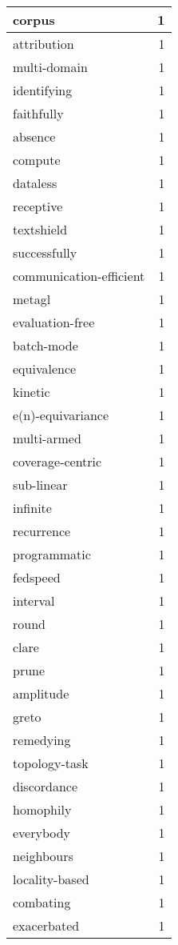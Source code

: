 \begin{table}[h]
\begin{tabular}{|l|r|}
\hline
corpus & 1 \\
\hline
attribution & 1 \\
\hline
multi-domain & 1 \\
\hline
identifying & 1 \\
\hline
faithfully & 1 \\
\hline
absence & 1 \\
\hline
compute & 1 \\
\hline
dataless & 1 \\
\hline
receptive & 1 \\
\hline
textshield & 1 \\
\hline
successfully & 1 \\
\hline
communication-efficient & 1 \\
\hline
metagl & 1 \\
\hline
evaluation-free & 1 \\
\hline
batch-mode & 1 \\
\hline
equivalence & 1 \\
\hline
kinetic & 1 \\
\hline
e(n)-equivariance & 1 \\
\hline
multi-armed & 1 \\
\hline
coverage-centric & 1 \\
\hline
sub-linear & 1 \\
\hline
infinite & 1 \\
\hline
recurrence & 1 \\
\hline
programmatic & 1 \\
\hline
fedspeed & 1 \\
\hline
interval & 1 \\
\hline
round & 1 \\
\hline
clare & 1 \\
\hline
prune & 1 \\
\hline
amplitude & 1 \\
\hline
greto & 1 \\
\hline
remedying & 1 \\
\hline
topology-task & 1 \\
\hline
discordance & 1 \\
\hline
homophily & 1 \\
\hline
everybody & 1 \\
\hline
neighbours & 1 \\
\hline
locality-based & 1 \\
\hline
combating & 1 \\
\hline
exacerbated & 1 \\
\hline

\end{tabular}
\end{table}
